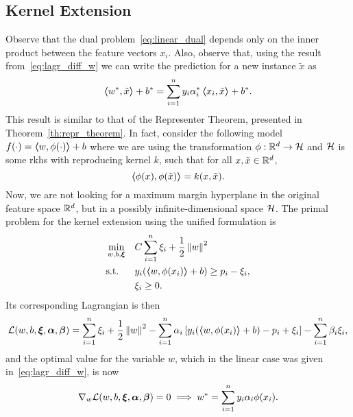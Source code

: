 \subsection{Kernel Extension}
Observe that the dual problem~\eqref{eq:linear_dual} depends only on the inner product between the feature vectors $x_i$. Also, observe that, using the result from~\eqref{eq:lagr_diff_w} we can write the prediction for a new instance $\tilde{x}$ as 
\begin{equation}
    \nonumber
    \bm{\left\langle} {w}^*, \tilde{x} \bm{\right\rangle} + {b}^* = \sum_{i = 1}^n y_i {\alpha}^*_i \bm{\left\langle} x_i, \tilde{x} \bm{\right\rangle} + {b}^* .
\end{equation} 
This result is similar to that of the Representer Theorem, presented in Theorem~\ref{th:repr_theorem}.
In fact, consider the following model 
$f(\cdot) = \bm{\left\langle} w, \phi(\cdot) \bm{\right\rangle} + b$
where we are using the transformation $\phi: \mathbb{R}^d \to \mathcal{H}$ and $\mathcal{H}$ is some \acrshort{rkhs} with reproducing kernel $k$, such that for all $x, \tilde{x} \in \mathbb{R}^d$, 
$$ \bm{\left\langle} \phi(x), \phi(\tilde{x}) \bm{\right\rangle} = k(x, \tilde{x}) .$$ 
Now, we are not looking for a maximum margin hyperplane in the original feature space $\mathbb{R}^d$, but in a possibly infinite-dimensional space $\mathcal{H}$.
The primal problem for the kernel extension using the unified formulation is
\begin{equation}
    \label{eq:kernel_primal}
    \begin{aligned}
        &\min_{w, b, \fv{\xi}} & & C \sum_{i=1}^\nsamples \xi_i + \frac{1}{2} \norm{w}^2 \\
        & \text{s.t.} & & y_i (\dotp{w}{\phi(x_i)} + b) \geq p_i - \xi_i , \\
        & & & \xi_i \geq 0 .    
    \end{aligned}  
\end{equation}
Its corresponding Lagrangian is then 
\begin{equation}
    \nonumber
    \mathcal{L}(w, b, \bm{\xi}, \bm{\alpha}, \bm{\beta}) = \sum_{i=1}^n \xi_i + \frac{1}{2} \left\lVert w\right\rVert^2 - \sum_{i=1}^n \alpha_i \left[ y_i (\bm{\left\langle} w, \phi(x_i) \bm{\right\rangle} + b) - p_i + \xi_i \right] - \sum_{i=1}^n \beta_i \xi_i ,
\end{equation}
and the optimal value for the variable $w$, which in the linear case was given in~\eqref{eq:lagr_diff_w}, is now
\begin{equation}\label{eq:lagr_diff_w_kernel}
    \nabla_w \lagr(w, b, \fv{\xi}, \fv{\alpha}, \fv{\beta}) = 0 \implies \opt{w} = \sum_{i=1}^\nsamples y_i \alpha_i \phi(x_i) .
\end{equation}
